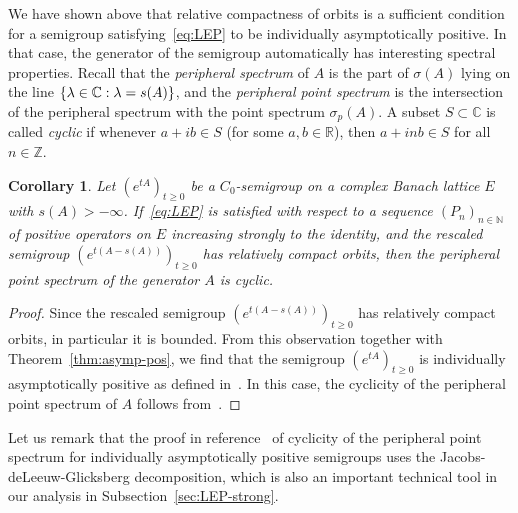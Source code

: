 \documentclass[sn-mathphys]{sn-jnl}%
\theoremstyle{thmstyleone}
\newtheorem{corollary}[theorem]{Corollary}
\theoremstyle{thmstylethree}
\let\Re\relax
\DeclareMathOperator{\Re}{Re}
\newcommand{\NN}{\mathbb{N}}
\newcommand{\ZZ}{\mathbb{Z}}
\newcommand{\RR}{\mathbb{R}}
\newcommand{\CC}{\mathbb{C}}
\begin{document}
We have shown above that relative compactness of orbits is a sufficient condition for a semigroup satisfying~\eqref{eq:LEP} to be individually asymptotically positive. In that case, the generator of the semigroup automatically has interesting spectral properties. Recall that the \emph{peripheral spectrum} of $A$ is the part of $\sigma(A)$ lying on the line $\{\lambda\in\CC : \Re\lambda = s(A)\}$, and the \emph{peripheral point spectrum} is the intersection of the peripheral spectrum with the point spectrum $\sigma_p(A)$. A subset $S\subset\CC$ is called \emph{cyclic} if whenever $a+ib \in S$ (for some $a,b\in\RR$), then $a+inb\in S$ for all $n\in\ZZ$.
\begin{corollary}
	\label{cor:cyclic}
	Let $(e^{tA})_{t\ge 0}$ be a $C_0$-semigroup on a complex Banach lattice $E$ with $s(A)>-\infty$. If~\eqref{eq:LEP} is satisfied with respect to a sequence $(P_n)_{n\in\NN}$ of positive operators on $E$ increasing strongly to the identity, and the rescaled semigroup $(e^{t(A-s(A))})_{t\ge 0}$ has relatively compact orbits, then the peripheral point spectrum of the generator $A$ is cyclic.
\end{corollary}
\begin{proof}
	Since the rescaled semigroup $(e^{t(A-s(A))})_{t\ge 0}$ has relatively compact orbits, in particular it is bounded. From this observation together with Theorem~\ref{thm:asymp-pos}, we find that the semigroup $(e^{tA})_{t\ge 0}$ is individually asymptotically positive as defined in~\cite[Definition 8.1]{DGK2}. In this case, the cyclicity of the peripheral point spectrum of $A$ follows from~\cite[Theorem 6.3.2]{GTh}.
\end{proof}
Let us remark that the proof in reference~\cite{GTh} of cyclicity of the peripheral point spectrum for individually asymptotically positive semigroups uses the Jacobs-deLeeuw-Glicksberg decomposition, which is also an important technical tool in our analysis in Subsection~\ref{sec:LEP-strong}.
\end{document}
